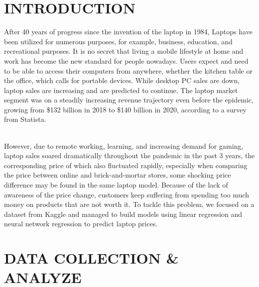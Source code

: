 \documentclass{scrartcl}
\begin{document}


\section{INTRODUCTION}

After 40 years of progress since the invention of the laptop in 1984, Laptops have been utilized for numerous purposes, for example, business, education, and recreational purposes. It is no secret that living a mobile lifestyle at home and work has become the new standard for people nowadays. Users expect and need to be able to access their computers from anywhere, whether the kitchen table or the office, which calls for portable devices. While desktop PC sales are down, laptop sales are increasing and are predicted to continue. The laptop market segment was on a steadily increasing revenue trajectory even before the epidemic, growing from \$132 billion in 2018 to \$140 billion in 2020, according to a survey from Statista. \par
~\\
\noindent However, due to remote working, learning, and increasing demand for gaming, laptop sales soared dramatically throughout the pandemic in the past 3 years, the corresponding price of which also fluctuated rapidly, especially when comparing the price between online and brick-and-mortar stores, some shocking price difference may be found in the same laptop model. Because of the lack of awareness of the price change, customers keep suffering from spending too much money on products that are not worth it. To tackle this problem, we focused on a dataset from Kaggle and managed to build models using linear regression and neural network regression \cite{chen} to predict laptop prices. 

\section{DATA COLLECTION & ANALYZE}
\end{document}
